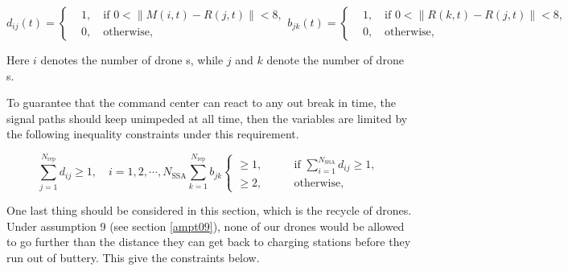 \documentclass[13pt]{ctexart} %
\begin{document}
\begin{subequations}
    \begin{equation}
        d_{ij}(t)=\left\{
            \begin{aligned}
                &1, \quad \text{if } 0< \lVert M(i,t)-R(j,t)\rVert< 8,\\
                &0,\quad \text{otherwise},
            \end{aligned}
        \right.
    \end{equation}
    \begin{equation}
        b_{jk}(t)=\left\{
            \begin{aligned}
                &1, \quad \text{if } 0< \lVert R(k,t)-R(j,t)\rVert< 8,\\
                &0,\quad \text{otherwise},
            \end{aligned}
        \right.
    \end{equation}
\end{subequations}

 Here $i$ denotes the number of drone \uppercase\expandafter{}s, while $j$ and $k$ denote the number of drone \uppercase\expandafter{}s.

To guarantee that the command center can react to any out break in time, the signal paths should keep unimpeded at all time, then the variables are limited by the following inequality constraints under this requirement.

\begin{subequations}
    \begin{equation}
        \sum_{j=1}^{N_{\text{rep}}}d_{ij}\geq 1, \quad i=1,2,\cdots,N_{\text{SSA}}
    \end{equation}
    \begin{equation}
        \sum_{k=1}^{N_{\text{rep}}}b_{jk}\left\{
        \begin{aligned}
            \geq 1,& \qquad \text{if }\sum_{i=1}^{N_{\text{SSA}}} d_{ij}\geq 1,\\
            \geq 2,& \qquad \text{otherwise},
        \end{aligned}
        \right.
    \end{equation}
\end{subequations}

One last thing should be considered in this section, which is the recycle of drones. Under assumption 9 (see section \ref{ampt09}), none of our drones would be allowed to go further than the distance they can get back to charging stations before they run out of buttery. This give the constraints below.
\end{document}
